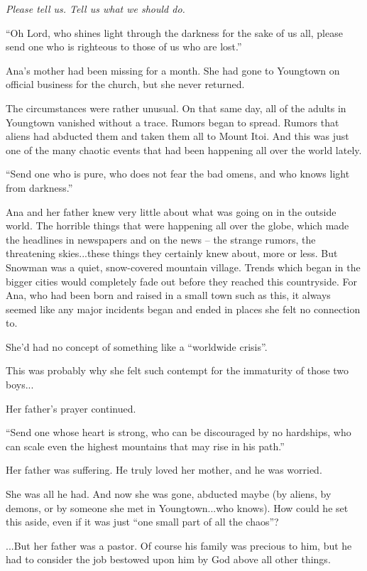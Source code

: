 \documentclass[
]{article}
\begin{document}
\emph{Please tell us. Tell us what we should do.}

``Oh Lord, who shines light through the darkness for the sake of us all,
please send one who is righteous to those of us who are lost.''

Ana's mother had been missing for a month. She had gone to Youngtown on
official business for the church, but she never returned.

The circumstances were rather unusual. On that same day, all of the
adults in Youngtown vanished without a trace. Rumors began to spread.
Rumors that aliens had abducted them and taken them all to Mount Itoi.
And this was just one of the many chaotic events that had been happening
all over the world lately.

``Send one who is pure, who does not fear the bad omens, and who knows
light from darkness.''

Ana and her father knew very little about what was going on in the
outside world. The horrible things that were happening all over the
globe, which made the headlines in newspapers and on the news -- the
strange rumors, the threatening skies...these things they certainly knew
about, more or less. But Snowman was a quiet, snow-covered mountain
village. Trends which began in the bigger cities would completely fade
out before they reached this countryside. For Ana, who had been born and
raised in a small town such as this, it always seemed like any major
incidents began and ended in places she felt no connection to.

She'd had no concept of something like a ``worldwide crisis''.

This was probably why she felt such contempt for the immaturity of those
two boys...

Her father's prayer continued.

``Send one whose heart is strong, who can be discouraged by no
hardships, who can scale even the highest mountains that may rise in his
path.''

Her father was suffering. He truly loved her mother, and he was worried.

She was all he had. And now she was gone, abducted maybe (by aliens, by
demons, or by someone she met in Youngtown...who knows). How could he
set this aside, even if it was just ``one small part of all the chaos''?

...But her father was a pastor. Of course his family was precious to
him, but he had to consider the job bestowed upon him by God above all
other things.
\end{document}
